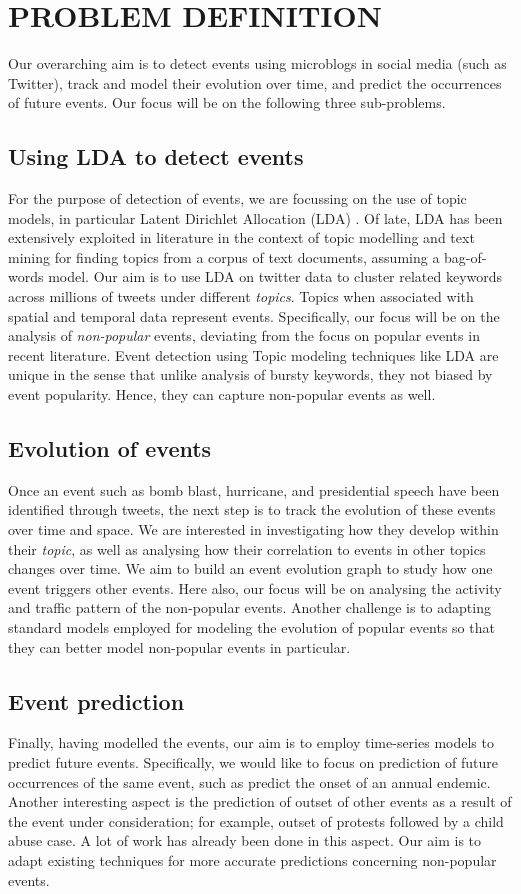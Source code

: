 \section{\uppercase{Problem Definition}}
Our overarching aim is to detect events using microblogs in social media (such as Twitter), track and model their evolution over time, and predict the occurrences of future events. Our focus will be on the following three sub-problems.
\subsection{Using LDA to detect events}
For the purpose of detection of events, we are focussing on the use of topic models, in particular Latent Dirichlet Allocation (LDA) \cite{blei2003latent}. Of late, LDA has been extensively exploited in literature in the context of topic modelling and text mining for finding topics from a corpus of text documents, assuming a bag-of-words model. Our aim is to use LDA on twitter data to cluster related keywords across millions of tweets under different \emph{topics}. Topics when associated with spatial and temporal data represent events. Specifically, our focus will be on the analysis of \emph{non-popular} events, deviating from the focus on popular events in recent literature. Event detection using Topic modeling techniques like LDA are unique in the sense that unlike analysis of bursty keywords, they not biased by event popularity. Hence, they can capture non-popular events as well.

\subsection{Evolution of events}
Once an event such as bomb blast, hurricane, and presidential speech have been identified through tweets, the next step is to track the evolution of these events over time and space. We are interested in investigating how they develop within their \emph{topic}, as well as analysing how their correlation to events in other topics changes over time. We aim to build an event evolution graph to study how one event triggers other events. Here also, our focus will be on analysing the activity and traffic pattern of the non-popular events. Another challenge is to adapting standard models employed for modeling the evolution of popular events \cite{lin2010pet} so that they can better model non-popular events in particular.

\subsection{Event prediction}
Finally, having modelled the events, our aim is to employ time-series models to predict future events. Specifically, we would like to focus on prediction of future occurrences of the same event, such as predict the onset of an annual endemic. Another interesting aspect is the prediction of outset of other events as a result of the event under consideration; for example, outset of protests followed by a child abuse case. A lot of work has already been done in this aspect. Our aim is to adapt existing techniques for more accurate predictions concerning non-popular events.